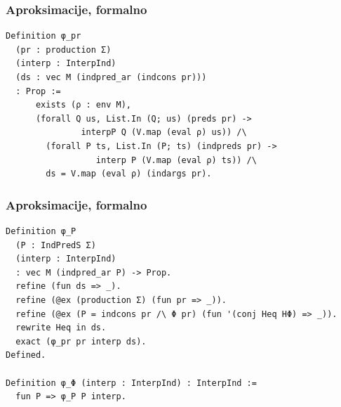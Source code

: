 \documentclass{beamer}
\begin{document}
\begin{frame}[fragile]
  \frametitle{Aproksimacije, formalno}
  \begin{footnotesize}
\begin{verbatim}
Definition φ_pr
  (pr : production Σ)
  (interp : InterpInd)
  (ds : vec M (indpred_ar (indcons pr)))
  : Prop :=
      exists (ρ : env M),
      (forall Q us, List.In (Q; us) (preds pr) ->
               interpP Q (V.map (eval ρ) us)) /\
        (forall P ts, List.In (P; ts) (indpreds pr) ->
                  interp P (V.map (eval ρ) ts)) /\
        ds = V.map (eval ρ) (indargs pr).
\end{verbatim}
  \end{footnotesize}
\end{frame}
\addtocounter{framenumber}{-1}

\begin{frame}[fragile]
  \frametitle{Aproksimacije, formalno}
  \begin{scriptsize}
\begin{verbatim}
Definition φ_P
  (P : IndPredS Σ)
  (interp : InterpInd)
  : vec M (indpred_ar P) -> Prop.
  refine (fun ds => _).
  refine (@ex (production Σ) (fun pr => _)).
  refine (@ex (P = indcons pr /\ Φ pr) (fun '(conj Heq HΦ) => _)).
  rewrite Heq in ds.
  exact (φ_pr pr interp ds).
Defined.

Definition φ_Φ (interp : InterpInd) : InterpInd :=
  fun P => φ_P P interp.
\end{verbatim}
  \end{scriptsize}
\end{frame}
\addtocounter{framenumber}{-1}
\end{document}
